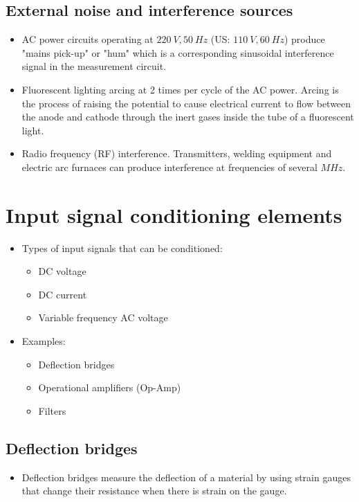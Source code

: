 \documentclass[11pt]{article}
\begin{document}
\subsection{External noise and interference sources}
\label{sec:org15fc961}
\begin{itemize}
\item AC power circuits operating at \(\qty{220}{V}, \qty{50}{Hz}\) (US: \(\qty{110}{V}, \qty{60}{Hz}\)) produce "mains pick-up" or "hum" which is a corresponding sinusoidal interference signal in the measurement circuit.
\item Fluorescent lighting arcing at 2 times per cycle of the AC power. Arcing is the process of raising the potential to cause electrical current to flow between the anode and cathode through the inert gases inside the tube of a fluorescent light.
\item Radio frequency (RF) interference. Transmitters, welding equipment and electric arc furnaces can produce interference at frequencies of several \(\unit{MHz}\).
\end{itemize}
\section{Input signal conditioning elements}
\label{sec:orga8c192f}
\begin{itemize}
\item Types of input signals that can be conditioned:
\begin{itemize}
\item DC voltage
\item DC current
\item Variable frequency AC voltage
\end{itemize}
\item Examples:
\begin{itemize}
\item Deflection bridges
\item Operational amplifiers (Op-Amp)
\item Filters
\end{itemize}
\end{itemize}
\subsection{Deflection bridges}
\label{sec:org5e89148}
\begin{itemize}
\item Deflection bridges measure the deflection of a material by using strain gauges that change their resistance when there is strain on the gauge.
\end{itemize}
\end{document}
